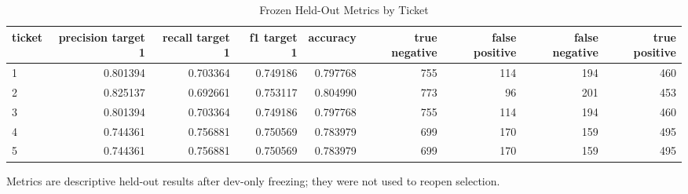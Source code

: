 \begin{table}[t]
\centering
\caption{Frozen Held-Out Metrics by Ticket}
\label{tab:heldout_metrics}
\begin{adjustbox}{max width=\textwidth}
\scriptsize
\begin{tabular}{lrrrrrrrr}
\hline
ticket & precision target 1 & recall target 1 & f1 target 1 & accuracy & true negative & false positive & false negative & true positive \\
\hline
1 & 0.801394 & 0.703364 & 0.749186 & 0.797768 & 755 & 114 & 194 & 460 \\
2 & 0.825137 & 0.692661 & 0.753117 & 0.804990 & 773 & 96 & 201 & 453 \\
3 & 0.801394 & 0.703364 & 0.749186 & 0.797768 & 755 & 114 & 194 & 460 \\
4 & 0.744361 & 0.756881 & 0.750569 & 0.783979 & 699 & 170 & 159 & 495 \\
5 & 0.744361 & 0.756881 & 0.750569 & 0.783979 & 699 & 170 & 159 & 495 \\
\hline
\end{tabular}
\end{adjustbox}
\par\footnotesize{Metrics are descriptive held-out results after dev-only freezing; they were not used to reopen selection.}
\end{table}
